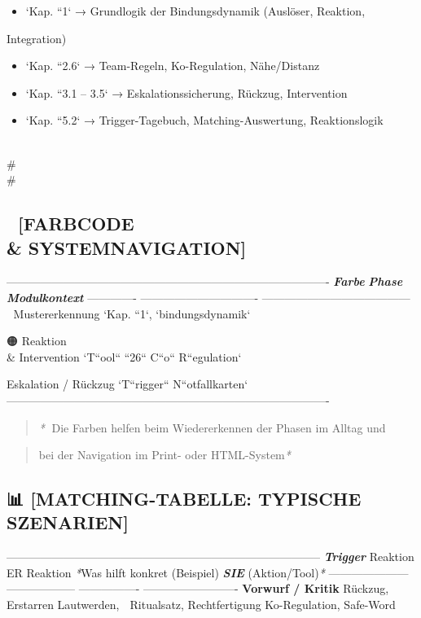 \begin{itemize}
\item   `Kap. ``1` → Grundlogik der Bindungsdynamik (Auslöser, Reaktion,
\end{itemize}
Integration)
\begin{itemize}
\item   `Kap. ``2.6` → Team-Regeln, Ko-Regulation, Nähe/Distanz
\item   `Kap. ``3.1 -- 3.5` → Eskalationssicherung, Rückzug, Intervention
\item   `Kap. ``5.2` → Trigger-Tagebuch, Matching-Auswertung, Reaktionslogik
\end{itemize}

\\#\\#

\subsection{🎨 \textbf{[FARBCODE \\& SYSTEMNAVIGATION]}}

-------------------------------------------------------------------------------------
\textbf{\textit{Farbe}}   \textbf{\textit{Phase}}                     \textbf{\textit{Modulkontext}}
------------- ------------------------------- ---------------------------------------
🔵            Mustererkennung                 `Kap. ``1`, `bindungsdynamik`

🟠            Reaktion \\& Intervention         `T``ool`` ``26`` C``o`` R``egulation`

\textcolor{ctmmRed}{}            Eskalation / Rückzug            `T``rigger`` N``otfallkarten`
-------------------------------------------------------------------------------------

\begin{quote}
\textit{*}📎 Die Farben helfen beim Wiedererkennen der Phasen im Alltag und
\end{quote}
\begin{quote}
bei der Navigation im Print- oder HTML-System\textit{*}
\end{quote}

\subsection{📊 \textbf{[MATCHING-TABELLE: TYPISCHE SZENARIEN]}}

-----------------------------------------------------------------------------------
\textbf{\textit{\textcolor{ctmmRed}{Trigger}            }}Reaktion ER\textbf{\textit{  }}Reaktion      \textit{*}Was hilft konkret
(Beispiel)\textbf{\textit{                            SIE}}           (Aktion/Tool)\textit{*}
--------------------- ------------------ ---------------- -------------------------
\textbf{Vorwurf / Kritik}  Rückzug, Erstarren Lautwerden,      🔁 Ritualsatz,
Rechtfertigung   Ko-Regulation, Safe-Word

